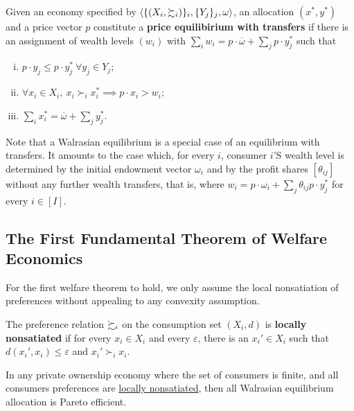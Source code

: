 \documentclass{report}
\begin{document}
		\begin{definition}[16.B.4]
			Given an economy specified by $\langle \{(X_i, \succsim_i)\}_i, \{Y_j\}_j, \omega \rangle$, an allocation $(x^*, y^*)$ and a price vector $p$ constitute a \textbf{price equilibirium with transfers} if there is an assignment of wealth levels $(w_i)$ with $\sum_i w_i = p \cdot \overline{\omega} + \sum_j p \cdot y_j^*$ such that
			\begin{enumerate}[(i)]
				\item $p \cdot y_j \leq p \cdot y_j^*\ \forall y_j \in Y_j$;
				\item $\forall x_i \in X_i,\ x_i \succ_i x_i^* \implies p \cdot x_i > w_i$;
				\item $\sum_i x_i^* = \overline{\omega} + \sum_j y_j^*$.
			\end{enumerate}
		\end{definition}
		
		\begin{remark}
			Note that a Walrasian equilibrium is a special case of an equilibrium with transfers. It amounts to the case which, for every $i$, consumer $i$'S wealth level is determined by the initial endowment vector $\omega_i$ and by the profit shares $[\theta_{ij}]$ without any further wealth transfers, that is, where $w_i = p \cdot \omega_i + \sum_{j} \theta_{ij} p \cdot y_j^*$ for every $i \in [I]$.
		\end{remark}
		
		\subsection{The First Fundamental Theorem of Welfare Economics}
		
		\begin{remark}
			For the first welfare theorem to hold, we only assume the local nonsatiation of preferences without appealing to any convexity assumption.
		\end{remark}
		
		\begin{definition}
			The preference relation $\succsim_i$ on the consumption set $(X_i, d)$ is \textbf{locally nonsatiated} if for every $x_i \in X_i$ and every $\varepsilon$, there is an $x_i' \in X_i$ such that $d(x_i', x_i) \leq \varepsilon$ and $x_i' \succ_i x_i$.
		\end{definition}
		
		\begin{theorem}
			In any private ownership economy where the set of consumers is finite, and all consumers preferences are \ul{locally nonsatiated}, then all Walrasian equilibrium allocation is Pareto efficient.
		\end{theorem}
		
\end{document}
